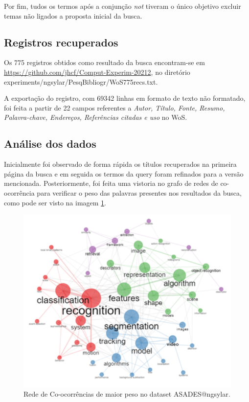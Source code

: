 Por fim, tudos os termos após a conjunção \textit{not} tiveram o único objetivo excluir temas não ligados a proposta inicial da busca.

\subsection{Registros recuperados}
Os 775 registros obtidos como resultado da busca encontram-se em \url{https://github.com/jhcf/Comput-Experim-20212}, no diretório {experiments/ngsylar/PesqBibliogr/WoS775recs.txt}.

A exportação do registro, com 69342 linhas em formato de texto não formatado, foi feita a partir de 22 campos referentes a \textit{Autor, Título, Fonte, Resumo, Palavra-chave, Endereços, Referências citadas e uso} no WoS.

\subsection{Análise dos dados}
Inicialmente foi observado de forma rápida os títulos recuperados na primeira página da busca e em seguida os termos da query foram refinados para a versão mencionada.
Posteriormente, foi feita uma vistoria no grafo de redes de co-ocorrência para verificar o peso das palavras presentes nos resultados da busca, como pode ser visto na imagem \ref{fig:evol:anual:cotonet:ASADES@ngsylar}.

\begin{figure}[H]
    \centering
    \includegraphics[width=1\textwidth]{experiments/ngsylar/PesqBibliogr/Imagens/ASADES-CoOccurrenceNetwork.png}
    \caption{Rede de Co-ocorrências de maior peso no dataset ASADES@ngsylar.}
    \label{fig:evol:anual:cotonet:ASADES@ngsylar}
\end{figure}

